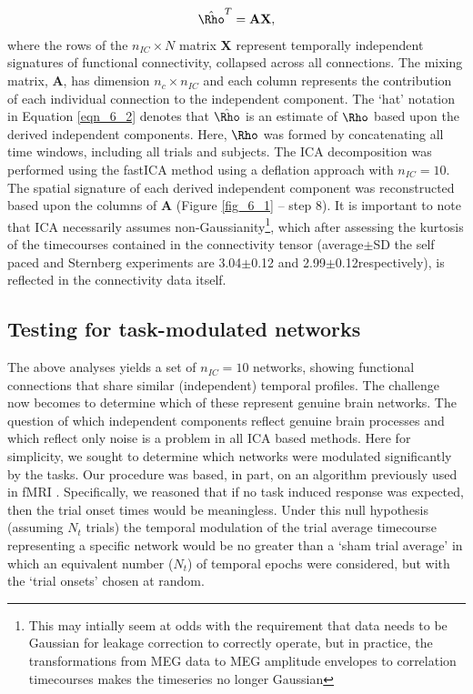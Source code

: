 \begin{equation}
\hat{\mathbf{\Rho}}^T = \mathbf{AX}, \label{eqn_6_2}
\end{equation} where the rows of the $n_{IC} \times N$ matrix \textbf{X} represent temporally independent signatures of functional connectivity, collapsed across all connections. The mixing matrix, \textbf{A}, has dimension $n_c \times n_{IC}$ and each column represents the contribution of each individual connection to the independent component. The ‘hat’ notation in Equation \ref{eqn_6_2} denotes that $\hat{\mathbf{\Rho}}$ is an estimate of $\mathbf{\Rho}$ based upon the derived independent components. Here, $\mathbf{\Rho}$ was formed by concatenating all time windows, including all trials and subjects. The ICA decomposition was performed using the fastICA method \citep{Hyvarinen1999} using a deflation approach with $n_{IC}=10$. The spatial signature of each derived independent component was reconstructed based upon the columns of \textbf{A} (Figure \ref{fig_6_1} – step 8). It is important to note that ICA necessarily assumes non-Gaussianity\footnote{This may intially seem at odds with the requirement that data needs to be Gaussian for leakage correction to correctly operate, but in practice, the transformations from MEG data to MEG amplitude envelopes to correlation timecourses makes the timeseries no longer Gaussian}, which after assessing the kurtosis of the timecourses contained in the connectivity tensor (average$\pm$SD the self paced and Sternberg experiments are 3.04$\pm$0.12 and 2.99$\pm$0.12respectively), is reflected in the connectivity data itself.

\subsection{Testing for task-modulated networks}
The above analyses yields a set of $n_{IC}=10$ networks, showing functional connections that share similar (independent) temporal profiles. The challenge now becomes to determine which of these represent genuine brain networks. The question of which independent components reflect genuine brain processes and which reflect only noise is a problem in all ICA based methods. Here for simplicity, we sought to determine which networks were modulated significantly by the tasks. Our procedure was based, in part, on an algorithm previously used in fMRI \citep{Clare1999}. Specifically, we reasoned that if no task induced response was expected, then the trial onset times would be meaningless. Under this null hypothesis (assuming $N_t$ trials) the temporal modulation of the trial average timecourse representing a specific network would be no greater than a ‘sham trial average’ in which an equivalent number ($N_t$) of temporal epochs were considered, but with the ‘trial onsets’ chosen at random.  

